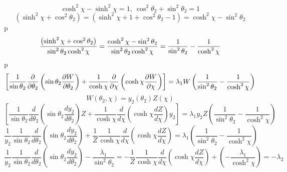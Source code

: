 \documentclass[a4paper,12pt]{article}
\begin{document}
\begin{equation*}
\cosh ^{2}\chi -\sinh ^{2}\chi =1,\ \cos ^{2}\theta _{2}+\sin ^{2}\theta
_{2}=1
\end{equation*}%
\begin{equation*}
\left( \sinh ^{2}\chi +\cos ^{2}\theta _{2}\right) =\left( \sinh ^{2}\chi
+1+\cos ^{2}\theta _{2}-1\right) =\cosh ^{2}\chi -\sin ^{2}\theta _{2}
\end{equation*}%
p%
\begin{equation*}
\frac{\left( \sinh ^{2}\chi +\cos ^{2}\theta _{2}\right) }{\sin ^{2}\theta
_{2}\cosh ^{2}\chi }=\frac{\cosh ^{2}\chi -\sin ^{2}\theta _{2}}{\sin
^{2}\theta _{2}\cosh ^{2}\chi }=\frac{1}{\sin ^{2}\theta _{2}}-\frac{1}{%
\cosh ^{2}\chi }
\end{equation*}%
p%
\begin{equation*}
\left[ \frac{1}{\sin \theta _{2}}\frac{\partial }{\partial \theta _{2}}%
\left( \sin \theta _{2}\frac{\partial W}{\partial \theta _{2}}\right) +\frac{%
1}{\cosh \chi }\frac{\partial }{\partial \chi }\left( \cosh \chi \frac{%
\partial W}{\partial \chi }\right) \right] =\lambda _{1}W\left( \frac{1}{%
\sin ^{2}\theta _{2}}-\frac{1}{\cosh ^{2}\chi }\right) 
\end{equation*}%
\begin{equation*}
W\left( \theta _{2},\chi \right) =y_{2}\left( \theta _{2}\right) Z\left(
\chi \right) 
\end{equation*}%
\begin{equation*}
\left[ \frac{1}{\sin \theta _{2}}\frac{d}{d\theta _{2}}\left( \sin \theta
_{2}\frac{dy_{2}}{d\theta _{2}}\right) Z+\frac{1}{\cosh \chi }\frac{d}{d\chi 
}\left( \cosh \chi \frac{dZ}{d\chi }\right) y_{2}\right] =\lambda
_{1}y_{2}Z\left( \frac{1}{\sin ^{2}\theta _{2}}-\frac{1}{\cosh ^{2}\chi }%
\right) 
\end{equation*}%
\begin{equation*}
\frac{1}{y_{2}}\frac{1}{\sin \theta _{2}}\frac{d}{d\theta _{2}}\left( \sin
\theta _{2}\frac{dy_{2}}{d\theta _{2}}\right) +\frac{1}{Z}\frac{1}{\cosh
\chi }\frac{d}{d\chi }\left( \cosh \chi \frac{dZ}{d\chi }\right) =\lambda
_{1}\left( \frac{1}{\sin ^{2}\theta _{2}}-\frac{1}{\cosh ^{2}\chi }\right) 
\end{equation*}%
\begin{equation*}
\frac{1}{y_{2}}\frac{1}{\sin \theta _{2}}\frac{d}{d\theta _{2}}\left( \sin
\theta _{2}\frac{dy_{2}}{d\theta _{2}}\right) -\frac{\lambda _{1}}{\sin
^{2}\theta _{2}}=-\frac{1}{Z}\frac{1}{\cosh \chi }\frac{d}{d\chi }\left(
\cosh \chi \frac{dZ}{d\chi }\right) +\left( -\frac{\lambda _{1}}{\cosh
^{2}\chi }\right) =-\lambda _{2}
\end{equation*}%
\end{document}
